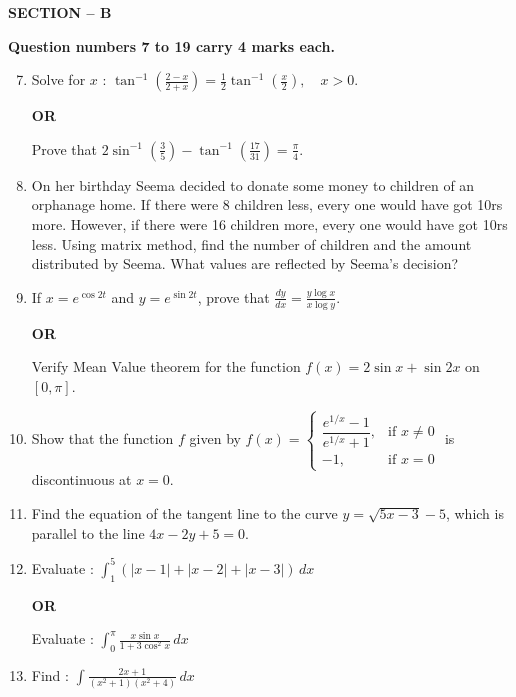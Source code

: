 \documentclass[12pt]{article}
\begin{document}
\vspace{10pt}

\begin{center}
\textbf{SECTION -- B}
\end{center}

\textbf{Question numbers 7 to 19 carry 4 marks each.}

\begin{enumerate}
\setcounter{enumi}{6}

\item Solve for $x$ :
\large
$
\tan^{-1}\left(\frac{2-x}{2+x}\right)=\frac{1}{2}\tan^{-1}\left(\frac{x}{2}\right), \quad x>0.
$

\normalsize
\begin{center}
  \textbf{OR}  
\end{center}

Prove that
$
2\sin^{-1}\left(\frac{3}{5}\right)-\tan^{-1}\left(\frac{17}{31}\right)=\frac{\pi}{4}.
$

\item On her birthday Seema decided to donate some money to children of an orphanage home. If there were 8 children less, every one would have got 10rs more. However, if there were 16 children more, every one would have got 10rs less. Using matrix method, find the number of children and the amount distributed by Seema. What values are reflected by Seema's decision?

\item If $x=e^{\cos 2t}$ and $y=e^{\sin 2t}$, prove that
\Large
$
\frac{dy}{dx}=\frac{y\log x}{x\log y}.
$
\normalsize
\begin{center}
  \textbf{OR}  
\end{center}

Verify Mean Value theorem for the function $f(x)=2\sin x+\sin 2x$ on $[0,\pi]$.

\item Show that the function $f$ given by
$
f(x)=
\begin{cases}
\dfrac{e^{1/x}-1}{e^{1/x}+1}, & \text{if } x\ne0\\
-1, & \text{if } x=0
\end{cases}
$
\normalsize
is discontinuous at $x=0$.

\item Find the equation of the tangent line to the curve $y=\sqrt{5x-3}-5$, which is parallel to the line $4x-2y+5=0$.

\item Evaluate :
\large
$
\int_1^5 \left(|x-1|+|x-2|+|x-3|\right)\,dx
$
\normalsize
\begin{center}
  \textbf{OR}  
\end{center}


Evaluate :
\large
$
\int_0^\pi \frac{x\sin x}{1+3\cos^2 x}\,dx
$

\item \normalsize Find :
\large
$
\int \frac{2x+1}{(x^2+1)(x^2+4)}\,dx
$

\end{enumerate}
\end{document}
